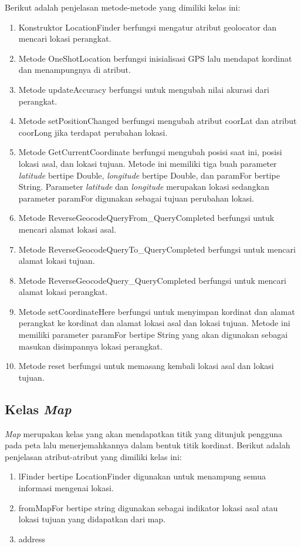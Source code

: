 Berikut adalah penjelasan metode-metode yang dimiliki kelas ini:
\begin{enumerate}
	\item Konstruktor LocationFinder berfungsi mengatur atribut geolocator dan mencari lokasi perangkat.
	\item Metode OneShotLocation berfungsi inisialisasi GPS lalu mendapat kordinat dan menampungnya di atribut.
	\item Metode updateAccuracy berfungsi untuk mengubah nilai akurasi dari perangkat.
	\item Metode setPositionChanged berfungsi mengubah atribut coorLat dan atribut coorLong jika terdapat perubahan lokasi.
	\item Metode GetCurrentCoordinate berfungsi mengubah posisi saat ini, posisi lokasi asal, dan lokasi tujuan. Metode ini memiliki tiga buah parameter \textit{latitude} bertipe Double, \textit{longitude} bertipe Double, dan paramFor bertipe String. Parameter \textit{latitude} dan \textit{longitude} merupakan lokasi sedangkan parameter paramFor digunakan sebagai tujuan perubahan lokasi. 
	\item Metode ReverseGeocodeQueryFrom\_QueryCompleted berfungsi untuk mencari alamat lokasi asal.
	\item Metode ReverseGeocodeQueryTo\_QueryCompleted berfungsi untuk mencari alamat lokasi tujuan.
	\item Metode ReverseGeocodeQuery\_QueryCompleted berfungsi untuk mencari alamat lokasi perangkat.
	\item Metode setCoordinateHere berfungsi untuk menyimpan kordinat dan alamat perangkat ke kordinat dan alamat lokasi asal dan lokasi tujuan. Metode ini memiliki parameter paramFor bertipe String yang akan digunakan sebagai masukan disimpannya lokasi perangkat.
	\item Metode reset berfungsi untuk memasang kembali lokasi asal dan lokasi tujuan.
\end{enumerate}

\subsection{Kelas \textit{Map}}
\label{lab:Kelas Map}
\hspace{0.5cm} \textit{Map} merupakan kelas yang akan mendapatkan titik yang ditunjuk pengguna pada peta lalu menerjemahkannya dalam bentuk titik kordinat. Berikut adalah penjelasan atribut-atribut yang dimiliki kelas ini:
\begin{enumerate}
	\item lFinder bertipe LocationFinder digunakan untuk menampung semua informasi mengenai lokasi.
	\item fromMapFor bertipe string digunakan sebagai indikator lokasi asal atau lokasi tujuan yang didapatkan dari map.
	\item address
\end{enumerate}

